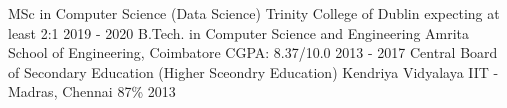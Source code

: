 \begin{cventries}
  \cventry
    {MSc in Computer Science (Data Science)}
    {Trinity College of Dublin}
    {expecting at least 2:1}
    {2019 - 2020}
    {\empty}
  \cventry
    {B.Tech. in Computer Science and Engineering}
    {Amrita School of Engineering, Coimbatore}
    {CGPA: 8.37/10.0}
    {2013 - 2017}
    {\empty}
  \cventry
    {Central Board of Secondary Education (Higher Sceondry Education)}
    {Kendriya Vidyalaya IIT - Madras, Chennai}
    {87\%}
    {2013}
    {\empty}
\end{cventries}
